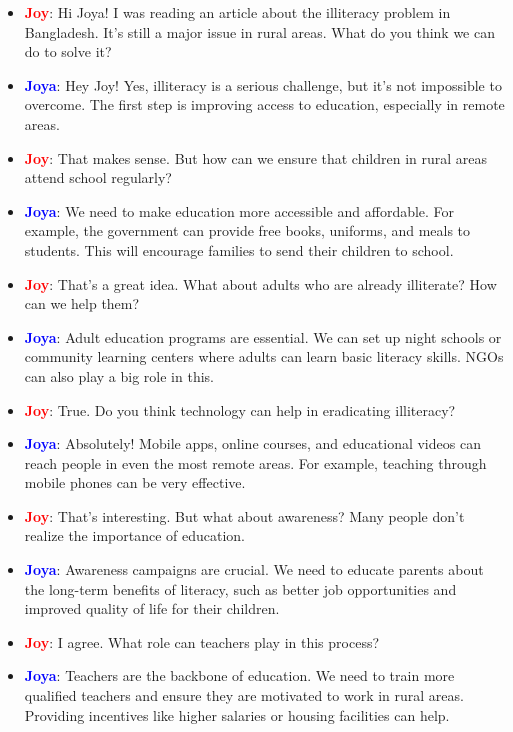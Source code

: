 \documentclass{article}
\begin{document}
\begin{itemize}
    \item \textbf{\textcolor{red}{Joy}}: Hi Joya! I was reading an article about the illiteracy problem in Bangladesh. It’s still a major issue in rural areas. What do you think we can do to solve it?
    \item \textbf{\textcolor{blue}{Joya}}: Hey Joy! Yes, illiteracy is a serious challenge, but it’s not impossible to overcome. The first step is improving access to education, especially in remote areas.
    \item \textbf{\textcolor{red}{Joy}}: That makes sense. But how can we ensure that children in rural areas attend school regularly?
    \item \textbf{\textcolor{blue}{Joya}}: We need to make education more accessible and affordable. For example, the government can provide free books, uniforms, and meals to students. This will encourage families to send their children to school.
    \item \textbf{\textcolor{red}{Joy}}: That’s a great idea. What about adults who are already illiterate? How can we help them?
    \item \textbf{\textcolor{blue}{Joya}}: Adult education programs are essential. We can set up night schools or community learning centers where adults can learn basic literacy skills. NGOs can also play a big role in this.
    \item \textbf{\textcolor{red}{Joy}}: True. Do you think technology can help in eradicating illiteracy?
    \item \textbf{\textcolor{blue}{Joya}}: Absolutely! Mobile apps, online courses, and educational videos can reach people in even the most remote areas. For example, teaching through mobile phones can be very effective.
    \item \textbf{\textcolor{red}{Joy}}: That’s interesting. But what about awareness? Many people don’t realize the importance of education.
    \item \textbf{\textcolor{blue}{Joya}}: Awareness campaigns are crucial. We need to educate parents about the long-term benefits of literacy, such as better job opportunities and improved quality of life for their children.
    \item \textbf{\textcolor{red}{Joy}}: I agree. What role can teachers play in this process?
    \item \textbf{\textcolor{blue}{Joya}}: Teachers are the backbone of education. We need to train more qualified teachers and ensure they are motivated to work in rural areas. Providing incentives like higher salaries or housing facilities can help.

\end{itemize}
\end{document}
